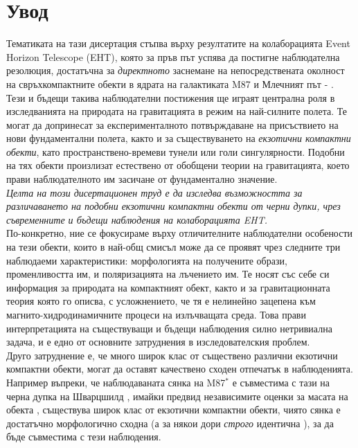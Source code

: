 \documentclass[12pt]{article}
\numberwithin{equation}{section}
\numberwithin{figure}{section}
\begin{document}
\nocite{EHT_M87_I,
	EHT_M87_II,
	EHT_M87_III,
	EHT_M87_IV,
	EHT_M87_V,
	EHT_M87_VI,
	EHT_M87_VII,
	EHT_M87_VIII,
	EHT_M87_IX,
	EHT_SGR_I,
	EHT_SGR_II,
	EHT_SGR_III,
	EHT_SGR_IV,
	EHT_SGR_V,
	EHT_SGR_VI,
	EHT_SGR_VII,
	EHT_SGR_VIII}
	
	\tableofcontents
	\listoffigures
	\listoftables
	\newpage
	\section{Увод}
	
	Тематиката на тази дисертация стъпва върху резултатите на колаборацията Event Horizon Telescope (EHT), която за пръв път успява да постигне наблюдателна резолюция, достатъчна за \emph{директното} заснемане на непосредствената околност на свръхкомпактните обекти в ядрата на галактиката M87 и Млечният път \cite{EHT_M87_I} - \cite{EHT_SGR_VIII}. Тези и бъдещи такива наблюдателни постижения ще играят централна роля в изследванията на природата на гравитацията в режим на най-силните полета. Те могат да допринесат за експерименталното потвърждаване на присъствието на нови фундаментални полета, както и за съществуването на \emph{екзотични компактни обекти}, като пространствено-времеви тунели или голи сингулярности. Подобни на тях обекти произлизат естествено от обобщени теории на гравитацията, което прави наблюдателното им засичане от фундаментално значение.\\
	
	\emph{Целта на този дисертационен труд е да изследва възможността за различаването на подобни екзотични компактни обекти от черни дупки, чрез съвременните и бъдещи наблюдения на колаборацията EHT.}\\
	
	\noindent По-конкретно, ние се фокусираме върху отличителните наблюдателни особености на тези обекти, които в най-общ смисъл може да се проявят чрез следните три наблюдаеми характеристики: морфологията на получените образи, променливостта им, и поляризацията на лъчението им. Те носят със себе си информация за природата на компактният обект, както и за гравитационната теория която го описва, с усложнението, че тя е нелинейно зацепена към магнито-хидродинамичните процеси на излъчващата среда. Това прави интерпретацията на съществуващи и бъдещи наблюдения силно нетривиална задача, и е едно от основните затруднения в изследователския проблем.\\
	
	\noindent Друго затруднение е, че много широк клас от съществено различни екзотични компактни обекти, могат да оставят качествено сходен отпечатък в наблюденията. Например въпреки, че наблюдаваната сянка на M87$^*$ е съвместима с тази на черна дупка на Шварцшилд \cite{EHT_M87_I}, имайки предвид независимите оценки за масата на обекта \cite{Gebhardt_2011}, съществува широк клас от екзотични компактни обекти, чиято сянка е достатъчно морфологично сходна (а за някои дори \emph{строго} идентична \cite{PhysRevD.103.084040}), за да бъде съвместима с тези наблюдения.\\
	
\end{document}
